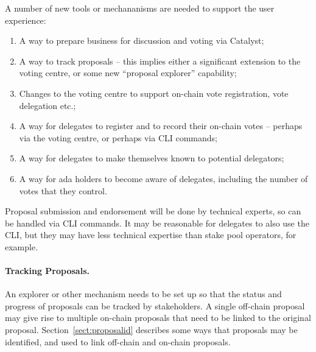 A number of new tools or mechananisms are needed to support the user experience:

\begin{enumerate}
\item
  A way to prepare business for discussion and voting via Catalyst;
\item
  A way to track proposals -- this implies either a significant extension to the voting centre, or some new ``proposal explorer'' capability;
\item
  Changes to the voting centre to support on-chain vote registration, vote delegation etc.;
\item
  A way for delegates to register and to record their on-chain votes -- perhaps via the voting centre, or perhaps via CLI commands;
\item
  A way for delegates to make themselves known to potential delegators;
\item
  A way for ada holders to become aware of delegates, including the number of votes that they control.
\end{enumerate}


Proposal submission and endorsement will be done by technical experts, so can be handled via CLI commands.  It may be reasonable for delegates
to also use the CLI, but they may have less technical expertise than stake pool operators, for example.

\paragraph{Tracking Proposals.}

An explorer or other mechanism needs to be set up so that the status and progress of proposals can be tracked by stakeholders.  A single off-chain proposal may give rise
to multiple on-chain proposals that need to be linked to the original proposal.  Section~\ref{sect:proposalid} describes some ways that proposals may be identified, and used
to link off-chain and on-chain proposals.
